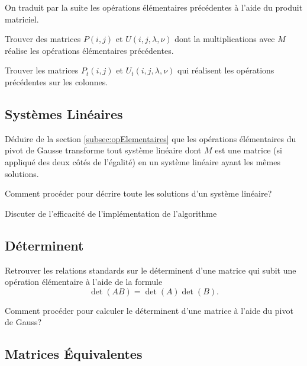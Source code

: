 \documentclass[11pt, a4paper]{article}
\begin{document}
On traduit par la suite les opérations élémentaires précédentes à
l'aide du produit matriciel.
\begin{question}
  Trouver des matrices $P(i, j)$ et $U(i, j, \lambda, \nu)$ dont la
  multiplications avec $M$ réalise les opérations élémentaires
  précédentes.
\end{question}

\begin{question}
  Trouver les matrices $P_t(i, j)$ et $U_t(i, j, \lambda, \nu)$ qui
  réalisent les opérations précédentes sur les colonnes.
\end{question}

\subsection{Systèmes Linéaires}

\begin{question}
  Déduire de la section \ref{subsec:opElementaires} que les opérations
  élémentaires du pivot de Gausse transforme tout système linéaire
  dont $M$ est une matrice (si appliqué des deux côtés de l'égalité)
  en un système linéaire ayant les mêmes solutions.
\end{question}

\begin{question}
  Comment procéder pour décrire toute les solutions d'un système
  linéaire?
\end{question}

\begin{question}
  Discuter de l'efficacité de l'implémentation de l'algorithme
\end{question}

\subsection{Déterminent}

\begin{question}
  Retrouver les relations standards sur le déterminent d'une matrice
  qui subit une opération élémentaire à l'aide de la formule
  \[
  \det(AB) = \det(A)\det(B).
  \]
\end{question}

\begin{question}
  Comment procéder pour calculer le déterminent d'une matrice à l'aide
  du pivot de Gauss?
\end{question}

\subsection{Matrices Équivalentes}
\end{document}
